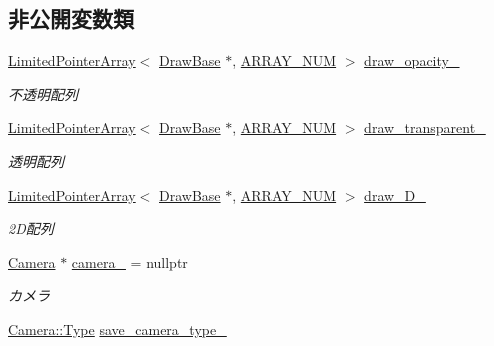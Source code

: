 \subsection*{非公開変数類}
\begin{DoxyCompactItemize}
\item 
\mbox{\hyperlink{class_limited_pointer_array}{Limited\+Pointer\+Array}}$<$ \mbox{\hyperlink{class_draw_base}{Draw\+Base}} $\ast$, \mbox{\hyperlink{class_render_target_main_ad677e34abb5ef7673d8ab52f47d8729e}{A\+R\+R\+A\+Y\+\_\+\+N\+UM}} $>$ \mbox{\hyperlink{class_render_target_main_a4ac66491bf33d7a19afc3c7b40fdc718}{draw\+\_\+opacity\+\_\+}}
\begin{DoxyCompactList}\small\item\em 不透明配列 \end{DoxyCompactList}\item 
\mbox{\hyperlink{class_limited_pointer_array}{Limited\+Pointer\+Array}}$<$ \mbox{\hyperlink{class_draw_base}{Draw\+Base}} $\ast$, \mbox{\hyperlink{class_render_target_main_ad677e34abb5ef7673d8ab52f47d8729e}{A\+R\+R\+A\+Y\+\_\+\+N\+UM}} $>$ \mbox{\hyperlink{class_render_target_main_add9d2c1221e301a35805cc0a1372793a}{draw\+\_\+transparent\+\_\+}}
\begin{DoxyCompactList}\small\item\em 透明配列 \end{DoxyCompactList}\item 
\mbox{\hyperlink{class_limited_pointer_array}{Limited\+Pointer\+Array}}$<$ \mbox{\hyperlink{class_draw_base}{Draw\+Base}} $\ast$, \mbox{\hyperlink{class_render_target_main_ad677e34abb5ef7673d8ab52f47d8729e}{A\+R\+R\+A\+Y\+\_\+\+N\+UM}} $>$ \mbox{\hyperlink{class_render_target_main_a9bf0ef6e95e18fcec8721ce90637a5fd}{draw\+\_\+D\+\_\+}}
\begin{DoxyCompactList}\small\item\em 2\+D配列 \end{DoxyCompactList}\item 
\mbox{\hyperlink{class_camera}{Camera}} $\ast$ \mbox{\hyperlink{class_render_target_main_a186546928b726af583a2e5f240185c8e}{camera\+\_\+}} = nullptr
\begin{DoxyCompactList}\small\item\em カメラ \end{DoxyCompactList}\item 
\mbox{\hyperlink{class_camera_a3b0a1f58deca679ac665f61c480d1dcb}{Camera\+::\+Type}} \mbox{\hyperlink{class_render_target_main_aa30119cd9eafbd7fb3a6a47cad4a6b45}{save\+\_\+camera\+\_\+type\+\_\+}}

\end{DoxyCompactItemize}
